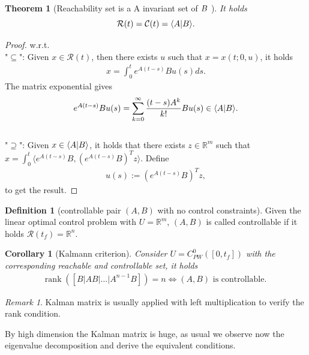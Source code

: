 \documentclass[a4paper,11pt,fleqn]{book}
\newtheorem{theorem}{Theorem}[section]
\newtheorem{corollary}{Corollary}[theorem]
\theoremstyle{definition}
\newtheorem{definition}{Definition}[section]
\theoremstyle{remark}
\newtheorem*{remark}{Remark}
\let\ran\relax
\DeclareMathOperator{\ran}{ran}
\DeclareMathOperator*{\rank}{rank}
\begin{document}
\begin{theorem}[Reachability set is a A invariant set of $\ran B$ ]
	It holds
	\begin{equation}
		\mathcal{R}(t) = \mathcal{C}(t) = \langle A |\ran B  \rangle. 
	\end{equation}
\end{theorem}
\begin{proof}
w.r.t. 
\quad\\
"$\subseteq$": Given $x \in \mathcal{R}(t)$, then there exists $u$ such that $x = x(t; 0, u)$, it holds 
\begin{align*}
	x = \int_0^t e^{A(t - s)} Bu(s) ds. 
\end{align*}
The matrix exponential gives
\begin{align*}
	e^{A(t - s)} B u(s) = \sum_{k = 0}^\infty \frac{(t-s) A^k}{k!} B  u(s) \in \langle A| \ran B\rangle. 
\end{align*}
\quad\\
"$\supseteq$": Given $x \in \langle A| \ran B\rangle$, it holds that there exists $z \in \mathbb{R}^m$ such that $x =  \int_0^t \langle e^{A(t - s)}B, (e^{A(t - s)}B)^T z \rangle$. 
Define 
\begin{align*}
	u(s):= (e^{A(t - s)}B)^T z, 
\end{align*} 
to get the result.
\end{proof}

\begin{definition}[controllable pair $(A, B)$ with no control constraints]
	Given the linear optimal control problem with $U = \mathbb{R}^m$, $(A, B)$ is called controllable if it holds $\mathcal{R}(t_f) = \mathbb{R}^n$. 
\end{definition}

\begin{corollary}[Kalmann criterion]
Consider $U = C_{PW}^0([0, t_f])$ with the corresponding reachable and controllable set, it holds
\begin{align*}
	\rank([ B |AB|\dots |A^{n -1}B ] ) = n \Leftrightarrow (A, B) \text{ is controllable. }
\end{align*}
\end{corollary}
\begin{remark}
Kalman matrix is usually applied with left multiplication to verify the rank condition. 	
\end{remark}


By high dimension the Kalman matrix is huge, as usual we observe now the eigenvalue decomposition and derive the equivalent conditions. 
\end{document}
